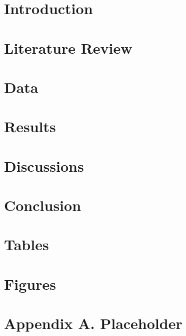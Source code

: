 \documentclass[12pt]{article}
\begin{document}
\section{Introduction} \label{sec:introduction}

\section{Literature Review} \label{sec:literature}

\section{Data} \label{sec:data}

\section{Results} \label{sec:result}

\section{Discussions} \label{sec:discussion}

\section{Conclusion} \label{sec:conclusion}



\singlespacing
\setlength\bibsep{0pt}





\clearpage

\onehalfspacing

\section*{Tables} \label{sec:tab}



\clearpage

\section*{Figures} \label{sec:fig}





\clearpage

\section*{Appendix A. Placeholder} \label{sec:appendixa}
\end{document}

